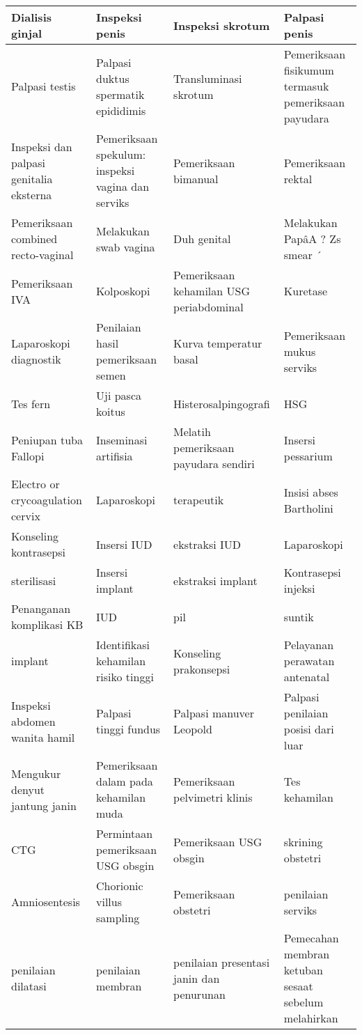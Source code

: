 {\begin{longtable}{|p{}|p{}|p{}|p{}|}
	Dialisis ginjal & Inspeksi penis & Inspeksi skrotum & Palpasi penis \\ \hline
	Palpasi testis & Palpasi duktus spermatik epididimis & Transluminasi skrotum & Pemeriksaan fisikumum termasuk pemeriksaan payudara \\ \hline
	Inspeksi dan palpasi genitalia eksterna & Pemeriksaan spekulum: inspeksi vagina dan serviks & Pemeriksaan bimanual & Pemeriksaan rektal \\ \hline
	Pemeriksaan combined recto-vaginal & Melakukan swab vagina & Duh genital & Melakukan PapâA ? Zs smear ´ \\ \hline
	Pemeriksaan IVA & Kolposkopi & Pemeriksaan kehamilan USG periabdominal & Kuretase \\ \hline
	Laparoskopi diagnostik & Penilaian hasil pemeriksaan semen & Kurva temperatur basal & Pemeriksaan mukus serviks \\ \hline
	Tes fern & Uji pasca koitus & Histerosalpingografi & HSG \\ \hline
	Peniupan tuba Fallopi & Inseminasi artifisia & Melatih pemeriksaan payudara sendiri & Insersi pessarium \\ \hline
	Electro or crycoagulation cervix & Laparoskopi & terapeutik & Insisi abses Bartholini \\ \hline
	Konseling kontrasepsi & Insersi IUD & ekstraksi IUD & Laparoskopi \\ \hline
	sterilisasi & Insersi implant & ekstraksi implant & Kontrasepsi injeksi \\ \hline
	Penanganan komplikasi KB & IUD & pil & suntik \\ \hline
	implant & Identifikasi kehamilan risiko tinggi & Konseling prakonsepsi & Pelayanan perawatan antenatal \\ \hline
	Inspeksi abdomen wanita hamil & Palpasi tinggi fundus & Palpasi manuver Leopold & Palpasi penilaian posisi dari luar \\ \hline
	Mengukur denyut jantung janin & Pemeriksaan dalam pada kehamilan muda & Pemeriksaan pelvimetri klinis & Tes kehamilan \\ \hline
	CTG & Permintaan pemeriksaan USG obsgin & Pemeriksaan USG obsgin & skrining obstetri \\ \hline
	Amniosentesis & Chorionic villus sampling & Pemeriksaan obstetri & penilaian serviks \\ \hline
	penilaian dilatasi & penilaian membran & penilaian presentasi janin dan penurunan & Pemecahan membran ketuban sesaat sebelum melahirkan \\ \hline

\end{longtable}}
